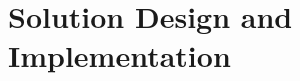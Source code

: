 \chapter{Solution Design and Implementation}

\label{chap:prototype}
\minitoc \mtcskip \noindent 








